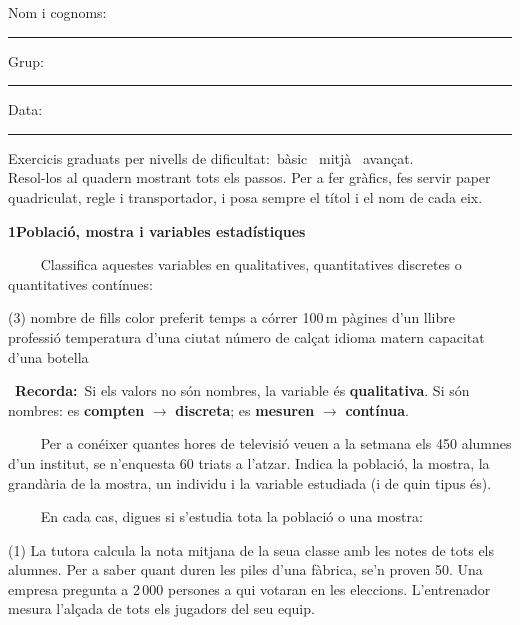 \documentclass[11pt,a4paper]{article}
\newcommand{\estrelles}[1]{{\color{accent}\ifcase#1\or\faStar\faStar[regular]\faStar[regular]\or\faStar\faStar\faStar[regular]\or\faStar\faStar\faStar\fi}}
\newcounter{exer}
\newcommand{\ex}[1]{\par\needspace{4\baselineskip}\medskip\stepcounter{exer}\noindent{\color{navy}\bfseries\theexer.}\ \ {\small\estrelles{#1}}\ \ }
\newcommand{\seccio}[2]{\par\needspace{10\baselineskip}\bigskip
  \begin{tcolorbox}[colback=navy,colframe=navy,coltext=white,arc=2mm,boxrule=0pt,left=3mm,right=3mm,top=1.2mm,bottom=1.2mm]
  {\large\bfseries #1\quad #2}
  \end{tcolorbox}\vspace{-2pt}}
\newcommand{\recorda}[1]{\par\smallskip\begin{tcolorbox}[colback=accent!7,colframe=accent!55,arc=2mm,boxrule=0.5pt,left=2.5mm,right=2.5mm,top=1mm,bottom=1mm]\small{\color{accent}\faLightbulb[regular]}\ \textbf{Recorda:}\ #1\end{tcolorbox}}
\begin{document}
\thispagestyle{primera}

\vspace{10pt}
Nom i cognoms: \rule{8.4cm}{0.4pt}\hfill Grup: \rule{1.6cm}{0.4pt}\hfill Data: \rule{2.2cm}{0.4pt}
\vspace{8pt}

\begin{tcolorbox}[colback=soft,colframe=soft,arc=2mm,left=3mm,right=3mm,top=1.5mm,bottom=1.5mm]
\small Exercicis graduats per nivells de dificultat:\quad \estrelles{1}\ bàsic \qquad \estrelles{2}\ mitjà \qquad \estrelles{3}\ avançat.\\[2pt] Resol-los al quadern mostrant tots els passos. Per a fer gràfics, fes servir paper quadriculat, regle i transportador, i posa sempre el títol i el nom de cada eix.
\end{tcolorbox}

\seccio{1}{Població, mostra i variables estadístiques}

\ex{1} Classifica aquestes variables en qualitatives, quantitatives discretes o quantitatives contínues:\begin{tasks}(3)
  \task nombre de fills
  \task color preferit
  \task temps a córrer 100\,m
  \task pàgines d'un llibre
  \task professió
  \task temperatura d'una ciutat
  \task número de calçat
  \task idioma matern
  \task capacitat d'una botella
\end{tasks}\recorda{Si els valors no són nombres, la variable és \textbf{qualitativa}. Si són nombres: es \textbf{compten} $\to$ \textbf{discreta}; es \textbf{mesuren} $\to$ \textbf{contínua}.}

\ex{1} Per a conéixer quantes hores de televisió veuen a la setmana els 450 alumnes d'un institut, se n'enquesta 60 triats a l'atzar. Indica la població, la mostra, la grandària de la mostra, un individu i la variable estudiada (i de quin tipus és).

\ex{1} En cada cas, digues si s'estudia tota la població o una mostra:\begin{tasks}(1)
  \task La tutora calcula la nota mitjana de la seua classe amb les notes de tots els alumnes.
  \task Per a saber quant duren les piles d'una fàbrica, se'n proven 50.
  \task Una empresa pregunta a 2\,000 persones a qui votaran en les eleccions.
  \task L'entrenador mesura l'alçada de tots els jugadors del seu equip.
\end{tasks}
\end{document}

